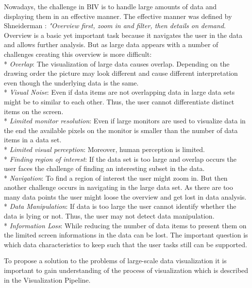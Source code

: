 Nowadays, the challenge in BIV is to handle large amounts of data and displaying them in an effective manner. The effective manner was defined by Shneiderman \cite{paterno1997concurtasktrees, Shneiderman2008, Keim2008}: \textit{"Overview first, zoom in and filter, then details on demand}. Overview is a basic yet important task because it navigates the user in the data and allows further analysis.  But as large data appears with a number of challenges creating this overview is more difficult\label{problems}:
\\*
\textit{Overlap}: 
The visualization of large data causes overlap. Depending on the drawing order the picture may look different and cause different interpretation even though the underlying data is the same. 
\\*
\textit{Visual Noise}: 
Even if data items are not overlapping data in large data sets might be to similar to each other. Thus, the user cannot differentiate distinct items on the screen.
\\*
\textit{Limited monitor resolution}:
Even if large monitors are used to visualize data in the end the available pixels on the monitor is smaller than the number of data items in a data set. 
\\*
\textit{Limited visual perception}:
Moreover, human perception is limited.
\\*
\textit{Finding region of interest}:
If the data set is too large and overlap occurs the user faces the challenge of finding an interesting subset in the data.
\\*
\textit{Navigation}:
To find a region of interest the user might zoom in. But then another challenge occurs in navigating in the large data set. As there are too many data points the user might loose the overview and get lost in data analysis.
\\*
\textit{Data Manipulation}:
If data is too large the user cannot identify whether the data is lying or not. Thus, the user may not detect data manipulation.
\\*
\textit{Information Loss}:
While reducing the number of data items to present them on the limited screen informations in the data can be lost. The important question is which data characteristics to keep such that the user tasks still can be supported.
\par
To propose a solution to the problems of large-scale data visualization it is important to gain understanding of the process of visualization which is described in the Visualization Pipeline. 
